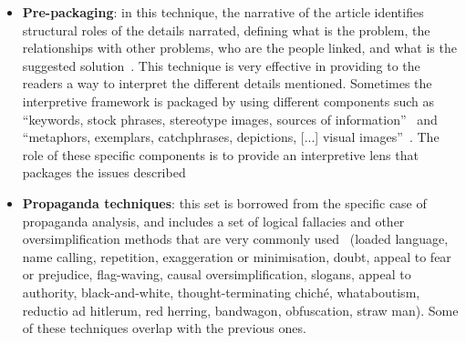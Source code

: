 \begin{itemize}
    
    \item \textbf{Pre-packaging}: in this technique, the narrative of the article identifies structural roles of the details narrated, defining what is the problem, the relationships with other problems, who are the people linked, and what is the suggested solution~\cite{entman1993framing,bell1991language}.
    This technique is very effective in providing to the readers a way to interpret the different details mentioned.
    Sometimes the interpretive framework is packaged by using different components such as ``keywords, stock phrases, stereotype images, sources of information''~\cite{entman1993framing} and ``metaphors, exemplars, catchphrases, depictions, [...] visual images''~\cite{gamson1989media}.
    The role of these specific components is to provide an interpretive lens that packages the issues described
    
    \item \textbf{Propaganda techniques}: this set is borrowed from the specific case of propaganda analysis, and includes a set of logical fallacies and other oversimplification methods that are very commonly used~\cite{da2019fine} (loaded language, name calling, repetition, exaggeration or minimisation, doubt, appeal to fear or prejudice, flag-waving, causal oversimplification, slogans, appeal to authority, black-and-white, thought-terminating chiché, whataboutism, reductio ad hitlerum, red herring, bandwagon, obfuscation, straw man).
    Some of these techniques overlap with the previous ones.
\end{itemize}



